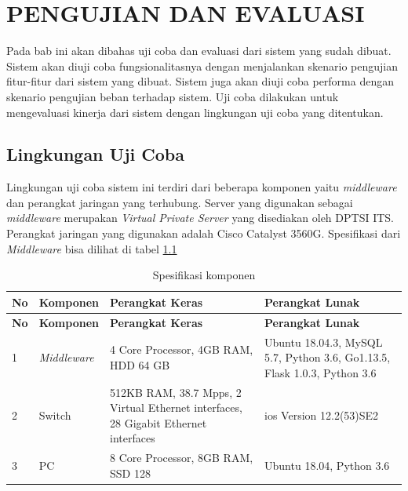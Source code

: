 \chapter{PENGUJIAN DAN EVALUASI}
Pada bab ini akan dibahas uji coba dan evaluasi dari sistem yang sudah dibuat. Sistem akan diuji coba fungsionalitasnya dengan menjalankan skenario pengujian fitur-fitur dari sistem yang dibuat. Sistem juga akan diuji coba performa dengan skenario pengujian beban terhadap sistem. Uji coba dilakukan untuk mengevaluasi kinerja dari sistem dengan lingkungan uji coba yang ditentukan.

\section{Lingkungan Uji Coba}
Lingkungan uji coba sistem ini terdiri dari beberapa komponen yaitu \textit{middleware} dan perangkat jaringan yang terhubung. Server yang digunakan sebagai \textit{middleware} merupakan \textit{Virtual Private Server} yang disediakan oleh DPTSI ITS. Perangkat jaringan yang digunakan adalah Cisco Catalyst 3560G. Spesifikasi dari \textit{Middleware} bisa dilihat di tabel \ref{tabelKomponen} 
   \begin{longtable}{|p{}|p{}|p{}|p{}|}
   	
   	\caption{Spesifikasi komponen} \label{tabelKomponen} \\
   	\hline
   	\textbf{No} & \textbf{Komponen} & \textbf{Perangkat Keras} & \textbf{Perangkat Lunak} \\ \hline
   	\endfirsthead
   	
   	\hline
   	\textbf{No} & \textbf{Komponen} & \textbf{Perangkat Keras} & \textbf{Perangkat Lunak} \\ \hline
   	\endhead
   	\endfoot
   	\endlastfoot
   	
   	1 & \textit{Middleware} & 4 Core Processor, 4GB RAM, HDD 64 GB & Ubuntu 18.04.3, MySQL 5.7, Python 3.6, Go1.13.5, Flask 1.0.3, Python 3.6 \\ \hline
   	2 & Switch & 512KB RAM, 38.7 Mpps, 2 Virtual Ethernet interfaces, 28 Gigabit Ethernet interfaces & ios Version 12.2(53)SE2 \\ \hline
   	3 & PC & 8 Core Processor, 8GB RAM, SSD 128 & Ubuntu 18.04, Python 3.6 \\ \hline
		
   	
   \end{longtable}

